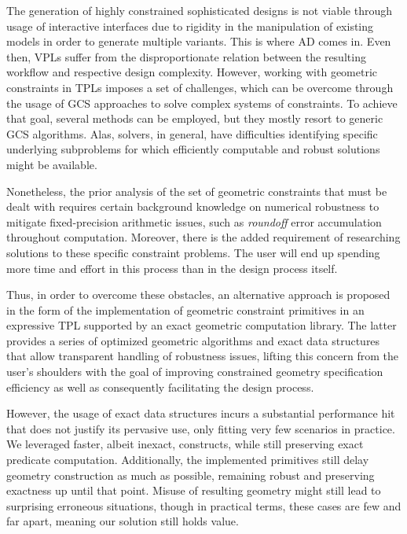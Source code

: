 %
\label{chap:conclusion}
\cleardoublepage{}

\noindent The generation of highly constrained sophisticated designs is not
viable through usage of interactive interfaces due to rigidity in the
manipulation of existing models in order to generate multiple variants.  This is
where \Ac{AD} comes in.  Even then, \acp{VPL} suffer from the disproportionate
relation between the resulting workflow and respective design complexity.
However, working with geometric constraints in \acp{TPL} imposes a set of
challenges, which can be overcome through the usage of \ac{GCS} approaches to
solve complex systems of constraints.  To achieve that goal, several methods can
be employed, but they mostly resort to generic \acs{GCS} algorithms.  Alas,
solvers, in general, have difficulties identifying specific underlying
subproblems for which efficiently computable and robust solutions might be
available.

Nonetheless, the prior analysis of the set of geometric constraints that must be
dealt with requires certain background knowledge on numerical robustness to
mitigate fixed-precision arithmetic issues, such as \textit{roundoff} error
accumulation throughout computation.  Moreover, there is the added requirement
of researching solutions to these specific constraint problems.  The user will
end up spending more time and effort in this process than in the design process
itself.

Thus, in order to overcome these obstacles, an alternative approach is proposed
in the form of the implementation of geometric constraint primitives in an
expressive \ac{TPL} supported by an exact geometric computation library.  The
latter provides a series of optimized geometric algorithms and exact data
structures that allow transparent handling of robustness issues, lifting this
concern from the user's shoulders with the goal of improving constrained
geometry specification efficiency as well as consequently facilitating the
design process.

However, the usage of exact data structures incurs a substantial performance hit
that does not justify its pervasive use, only fitting very few scenarios in
practice.  We leveraged faster, albeit inexact, constructs, while still
preserving exact predicate computation.  Additionally, the implemented
primitives still delay geometry construction as much as possible, remaining
robust and preserving exactness up until that point.  Misuse of resulting
geometry might still lead to surprising erroneous situations, though in
practical terms, these cases are few and far apart, meaning our solution still
holds value.

